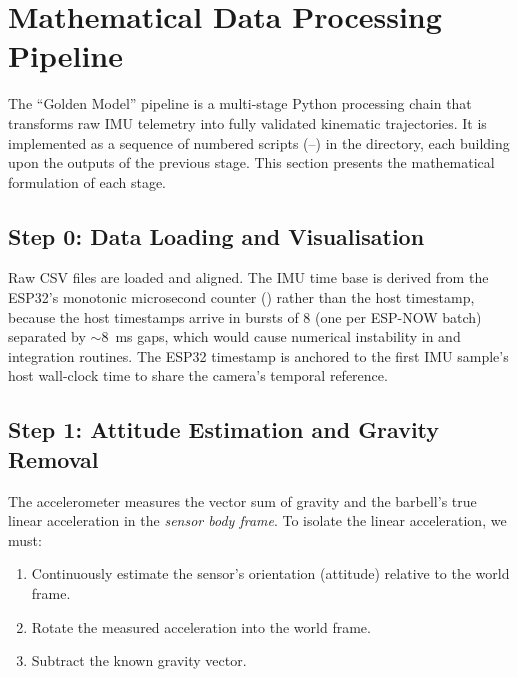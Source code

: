 \section{Mathematical Data Processing Pipeline}\label{sec:pipeline}

The ``Golden Model'' pipeline is a multi-stage Python processing chain that transforms raw IMU telemetry into fully validated kinematic trajectories.
It is implemented as a sequence of numbered scripts (--) in the  directory, each building upon the outputs of the previous stage.
This section presents the mathematical formulation of each stage.


\subsection{Step 0: Data Loading and Visualisation}

Raw CSV files are loaded and aligned.
The IMU time base is derived from the ESP32's monotonic microsecond counter () rather than the host timestamp, because the host timestamps arrive in bursts of 8 (one per ESP-NOW batch) separated by $\sim$\SI{8}{\milli\second} gaps, which would cause numerical instability in  and integration routines.
The ESP32 timestamp is anchored to the first IMU sample's host wall-clock time to share the camera's temporal reference.


\subsection{Step 1: Attitude Estimation and Gravity Removal}\label{sec:attitude}

The accelerometer measures the vector sum of gravity and the barbell's true linear acceleration in the \emph{sensor body frame}.
To isolate the linear acceleration, we must:
\begin{enumerate}[nosep]
  \item Continuously estimate the sensor's orientation (attitude) relative to the world frame.
  \item Rotate the measured acceleration into the world frame.
  \item Subtract the known gravity vector.
\end{enumerate}

